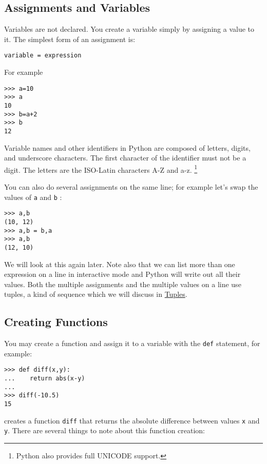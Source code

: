 \subsection{Assignments and Variables}
\label{assignments-and-variables}

Variables are not declared. You create a variable simply by assigning a value to it. The simplest form of an assignment is:

\begin{verbatim}
variable = expression
\end{verbatim}

For example

\begin{verbatim}
>>> a=10
>>> a
10
>>> b=a+2
>>> b
12
\end{verbatim}

Variable names and other identifiers in Python are composed of letters, digits, and underscore
characters. The first character of the identifier must not be a digit.  The letters are the ISO-Latin characters A-Z and a-z.
\footnote{Python also provides full UNICODE support.}

You can also do several assignments on the same line; for example let's swap the values of \texttt{a} and
\texttt{b} :


\begin{verbatim}
>>> a,b
(10, 12)
>>> a,b = b,a
>>> a,b
(12, 10)
\end{verbatim}

We will look at this again later.
Note also that we can list more than one expression on a line in
interactive mode and Python will write out all their values. Both the
multiple assignments and the multiple values on a line use tuples, a
kind of sequence which we will discuss in
\href{chap2.html\#92836}{Tuples}.

\subsection{Creating Functions}
\label{creating-functions}

You may create a function and assign it to a variable with the \texttt{def} statement, for example:


\begin{verbatim}
>>> def diff(x,y):
...    return abs(x-y)
...
>>> diff(-10.5)
15
\end{verbatim}


creates a function \texttt{diff} that returns the absolute difference between values \texttt{x} and \texttt{y}.
There are several things to note about this function creation:


